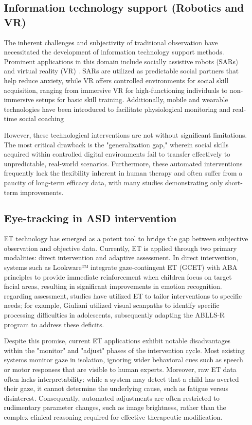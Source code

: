 \subsection{Information technology support (Robotics and VR)}
The inherent challenges and subjectivity of traditional observation have necessitated the development of information technology support methods. Prominent applications in this domain include socially assistive robots (SARs) \cite{new51} and virtual reality (VR) \cite{new52}. SARs are utilized as predictable social partners that help reduce anxiety, while VR offers controlled environments for social skill acquisition, ranging from immersive VR for high-functioning individuals to non-immersive setups for basic skill training. Additionally, mobile and wearable technologies have been introduced to facilitate physiological monitoring and real-time social coaching \cite{new56}

However, these technological interventions are not without significant limitations. The most critical drawback is the "generalization gap," wherein social skills acquired within controlled digital environments fail to transfer effectively to unpredictable, real-world scenarios. Furthermore, these automated interventions frequently lack the flexibility inherent in human therapy and often suffer from a paucity of long-term efficacy data, with many studies demonstrating only short-term improvements.

\subsection{Eye-tracking in ASD intervention}
ET technology has emerged as a potent tool to bridge the gap between subjective observation and objective data. Currently, ET is applied through two primary modalities: direct intervention and adaptive assessment. In direct intervention, systems such as Lookware™ \cite{ref11} integrate gaze-contingent ET (GCET) with ABA principles to provide immediate reinforcement when children focus on target facial areas, resulting in significant improvements in emotion recognition. regarding assessment, studies have utilized ET to tailor interventions to specific needs; for example, Giuliani \cite{ref09} utilized visual scanpaths to identify specific processing difficulties in adolescents, subsequently adapting the ABLLS-R program to address these deficits.

Despite this promise, current ET applications exhibit notable disadvantages within the "monitor" and "adjust" phases of the intervention cycle. Most existing systems monitor gaze in isolation, ignoring wider behavioral cues such as speech or motor responses that are visible to human experts. Moreover, raw ET data often lacks interpretability; while a system may detect that a child has averted their gaze, it cannot determine the underlying cause, such as fatigue versus disinterest. Consequently, automated adjustments are often restricted to rudimentary parameter changes, such as image brightness, rather than the complex clinical reasoning required for effective therapeutic modification.

